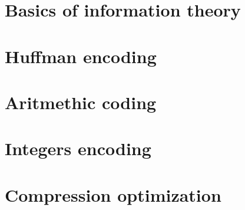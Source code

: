 \documentclass[moon, colormath]{lectures2}
\begin{document}

    \section{Basics of information theory}
    

    \section{Huffman encoding}
    

    \section{Aritmethic coding}
    

    \section{Integers encoding}
    

    \section{Compression optimization}
    
    \clearpage\printbibliography
    \clearpage\printglossaries
\end{document}
